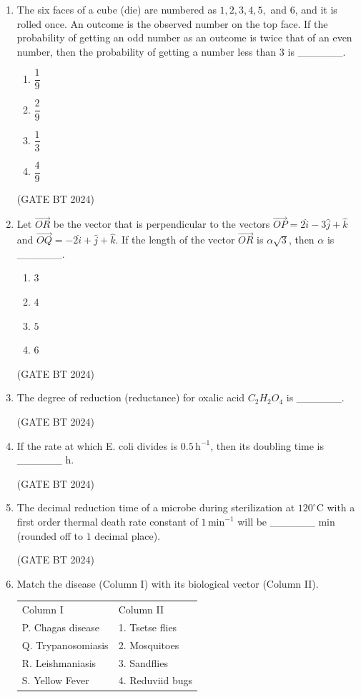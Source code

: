 \documentclass[journal,12pt,onecolumn]{IEEEtran}
\theoremstyle{remark}
\begin{document}
\begin{enumerate}
\item 
The six faces of a cube (die) are numbered as $1, 2, 3, 4, 5,$ and $6$, and it is rolled once. An outcome is the observed number on the top face. If the probability of getting an odd number as an outcome is twice that of an even number, then the probability of getting a number less than $3$ is \_\_\_\_\_\_.

\begin{enumerate}
    \item $\dfrac{1}{9}$
    \item $\dfrac{2}{9}$
    \item $\dfrac{1}{3}$
    \item $\dfrac{4}{9}$
\end{enumerate}
\hfill(GATE BT 2024)

\item 
Let $\vec{OR}$ be the vector that is perpendicular to the vectors $\vec{OP}=2\hat{i}-3\hat{j}+\hat{k}$ and $\vec{OQ}=-2\hat{i}+\hat{j}+\hat{k}$. If the length of the vector $\vec{OR}$ is $\alpha\sqrt{3}$, then $\alpha$ is \_\_\_\_\_\_.

\begin{enumerate}
    \item $3$
    \item $4$
    \item $5$
    \item $6$
\end{enumerate}
\hfill(GATE BT 2024)

\item 
The degree of reduction (reductance) for oxalic acid $C_2H_2O_4$ is \_\_\_\_\_\_.

\hfill(GATE BT 2024)

\item 
If the rate at which E. coli divides is $0.5\,\text{h}^{-1}$, then its doubling time is \_\_\_\_\_\_ h.

\hfill(GATE BT 2024)

\item 
The decimal reduction time of a microbe during sterilization at $120^\circ\text{C}$ with a first order thermal death rate constant of $1\,\text{min}^{-1}$ will be \_\_\_\_\_\_ min (rounded off to $1$ decimal place).

\hfill(GATE BT 2024)

\item 
Match the disease (Column I) with its biological vector (Column II).

\begin{tabular}{ll}
Column I & Column II \\
P. Chagas disease & 1. Tsetse flies \\
Q. Trypanosomiasis & 2. Mosquitoes \\
R. Leishmaniasis & 3. Sandflies \\
S. Yellow Fever & 4. Reduviid bugs \\
\end{tabular}


\end{enumerate}
\end{document}
